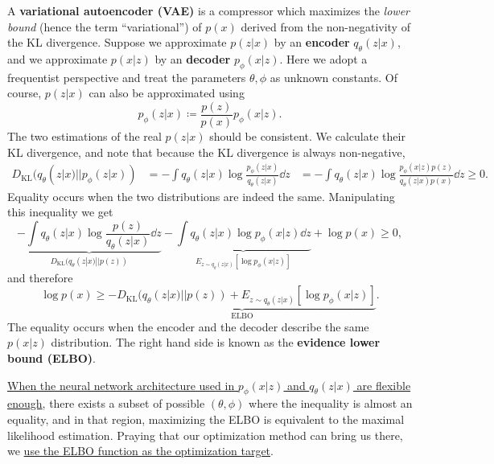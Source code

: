 \documentclass[hyperref, a4paper, 12pt]{report}
\newcommand*{\concept}[1]{{\textbf{#1}}}
\def\\{}%
\def\mathbb#1{#1}%
\begin{document}
A \concept{variational autoencoder (VAE)} is a compressor which maximizes the \emph{lower bound}
(hence the term ``variational'') of $p(x)$ derived from the non-negativity of the KL divergence.
Suppose we approximate $p(z|x)$ by an \concept{encoder} $q_\theta(z | x)$,
and we approximate $p(x|z)$ by an \concept{decoder} $p_\phi(x | z)$.
Here we adopt a frequentist perspective and treat the parameters $\theta, \phi$ as unknown constants.
Of course, $p(z | x)$ can also be approximated using 
\begin{equation}
    p_\phi(z | x) \coloneqq \frac{p(z)}{p(x)} p_\phi(x | z).
\end{equation}
The two estimations of the real $p(z | x)$ should be consistent.
We calculate their KL divergence, and note that because the KL divergence is always non-negative,
\begin{equation}
    \begin{aligned}
        D_{\text{KL}}(q_\theta(z|x) || p_\phi(z|x)) &= - \int q_\theta(z|x) \log \frac{p_\phi(z|x)}{q_\theta(z|x)} \dd{z} \\
        &= - \int q_\theta(z|x) \log \frac{p_\phi(x|z) p(z)}{q_\theta(z|x) p(x)} \dd{z} \geq 0.
    \end{aligned}
\end{equation} 
Equality occurs when the two distributions are indeed the same.
Manipulating this inequality we get 
\[
    \underbrace{- \int q_\theta(z|x) \log \frac{p(z)}{q_\theta(z|x)} \dd{z}}_{D_{\text{KL}}(q_\theta(z|x) ||p(z))} - \underbrace{\int q_\theta(z|x)  \log p_\phi(x|z) \dd{z}}_{\mathbb{E}_{z\sim q_\theta(z|x)}[\log p_\phi(x|z)]} + \log p(x) \geq 0,
\]
and therefore 
\begin{equation}
    \log p(x) \geq \underbrace{- D_{\text{KL}}(q_\theta(z|x) ||p(z)) + \mathbb{E}_{z\sim q_\theta(z|x)}[\log p_\phi(x|z)]}_{\text{ELBO}}.
    \label{eq:loss.vae.gaussian.elbo}
\end{equation}
The equality occurs when the encoder and the decoder describe the same $p(x|z)$ distribution.
The right hand side is known as the \concept{evidence lower bound (ELBO)}.

\uline{When the neural network architecture used in $p_\phi(x|z)$ and $q_\theta(z|x)$ are flexible enough},
there exists a subset of possible $(\theta, \phi)$ where the inequality is almost an equality,
and in that region, maximizing the ELBO is equivalent to the maximal likelihood estimation.
Praying that our optimization method can bring us there,
we \uline{use the ELBO function as the optimization target}.
\end{document}
